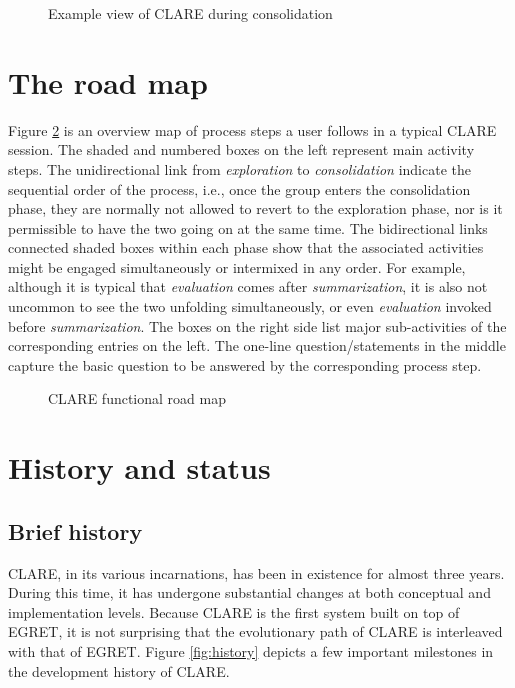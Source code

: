 \begin{figure}[htb]
  \centerline{}
  \caption{Example view of CLARE during consolidation}
  \label{fig:consolidate}
\end{figure}


\section{The road map}
\label{sec:roadmap}

Figure \ref{fig:roadmap} is an overview map of process steps a user follows
in a typical CLARE session. The shaded and numbered boxes on the left
represent main activity steps. The unidirectional link from {\it exploration\/}
to {\it consolidation\/} indicate the sequential order of the process, i.e.,
once the group enters the consolidation phase, they are normally not
allowed to revert to the exploration phase, nor is it permissible to have
the two going on at the same time.  The bidirectional links connected
shaded boxes within each phase show that the associated activities might be
engaged simultaneously or intermixed in any order. For example, although it
is typical that {\it evaluation\/} comes after {\it summarization\/}, it is
also not uncommon to see the two unfolding simultaneously, or even {\em
evaluation\/} invoked before {\it summarization\/}. The boxes on the right
side list major sub-activities of the corresponding entries on the
left. The one-line question/statements in the middle capture the basic
question to be answered by the corresponding process step.

\begin{figure}
  \caption{CLARE functional road map}
  \label{fig:roadmap}
\end{figure}


\section{History and status}
\label{sec:c4-history}

\subsection{Brief history}
\label{sec:history1}

CLARE, in its various incarnations, has been in existence for almost three
years. During this time, it has undergone substantial changes at both
conceptual and implementation levels.  Because CLARE is the first system
built on top of EGRET, it is not surprising that the evolutionary path of
CLARE is interleaved with that of EGRET. Figure \ref{fig:history} depicts a
few important milestones in the development history of CLARE.

